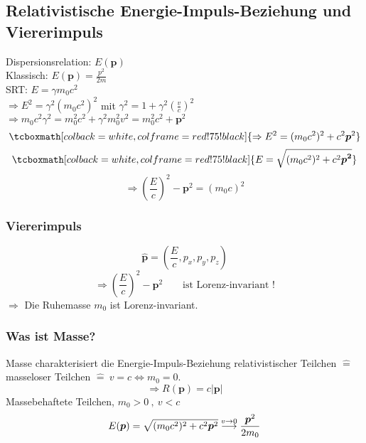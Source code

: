 \documentclass[titlepage,11pt,a4paper,ngerman]{report}
\newcommand{\tx}[1]{\textrm{#1}}
\renewcommand{\vec}[1]{\boldsymbol{#1}}
\newcommand{\rmbox}[1]{\tcboxmath[colback=white,colframe=red!75!black]{#1}}
\begin{document}
\subsection{Relativistische Energie-Impuls-Beziehung und Viererimpuls}
Dispersionsrelation: $ E(\vec{p}) $\\
Klassisch: $ E(\vec{p}) = \frac{p^2}{2m} $\\
SRT: $ E = \gamma m_0 c^2 $\\
$ \Rightarrow E^2 = \gamma ^2 (m_0 c^2)^2 $ mit $ \gamma ^2 = 1 + \gamma^2 \left(\frac{v}{c}\right)^2 $\\
$ \Rightarrow m_0 c^2 \gamma ^2 = m_0^2 c^2 + \gamma^2 m_0^2 v^2 = m_0^2 c^2 + \vec{p}^2 $
\begin{equation*}
\rmbox{\Rightarrow E^2 = (m_0 c^2)^2 + c^2 \vec{p}^2}
\end{equation*}
\begin{equation*}
\rmbox{E = \sqrt{(m_0 c^2)^2 + c^2 \vec{p^2}}}
\end{equation*}
\begin{equation*}
\Rightarrow \left(\frac{E}{c}\right)^2 - \vec{p}^2 = (m_0 c)^2
\end{equation*}

\subsubsection{Viererimpuls}
\begin{equation*}
\hat{\vec{p}} = \left(\frac{E}{c} , p_x, p_y, p_z\right)
\end{equation*}
\begin{equation*}
\Rightarrow \left(\frac{E}{c}\right)^2 - \vec{p}^2 \qquad \tx{ist Lorenz-invariant !}
\end{equation*}
$ \Rightarrow $ Die Ruhemasse $ m_0 $ ist Lorenz-invariant.

\subsubsection{Was ist Masse?}
Masse charakterisiert die Energie-Impuls-Beziehung relativistischer Teilchen $ \widehat{=} $ masseloser Teilchen $ \widehat{=}\ v = c \Leftrightarrow m_0 = 0 $.
\begin{equation*}
\Rightarrow R(\vec{p}) = c |\vec{p}|
\end{equation*}
Massebehaftete Teilchen, $ m_0 > 0 \ , \ v < c$
\begin{equation*}
E(\vec{p}) = \sqrt{(m_0 c^2)^2 + c^2 \vec{p}^2} \buildrel v \to 0 \over \longrightarrow \frac{\vec{p}^2}{2 m_0}
\end{equation*}
\end{document}
